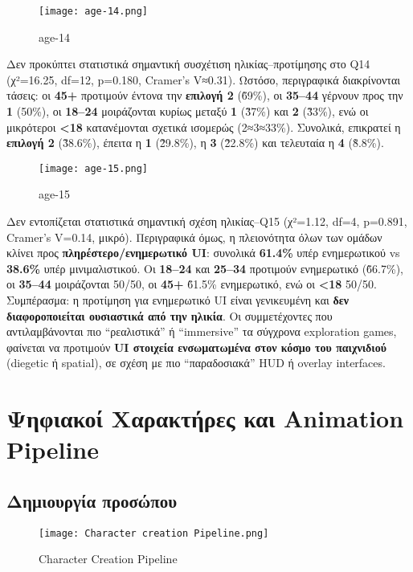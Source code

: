 \begin{figure}[H]
    \centering
    \texttt{[image: age-14.png]}
    \caption{age-14}
    \label{fig:placeholder}
\end{figure}
Δεν προκύπτει στατιστικά σημαντική συσχέτιση ηλικίας–προτίμησης στο Q14 (χ²=16.25, df=12, p=0.180, Cramer’s V≈0.31). Ωστόσο, περιγραφικά διακρίνονται τάσεις: οι \textbf{45+} προτιμούν έντονα την \textbf{επιλογή 2} (\~69\%), οι \textbf{35–44} γέρνουν προς την \textbf{1} (50\%), οι \textbf{18–24} μοιράζονται κυρίως μεταξύ \textbf{1} (\~37\%) και \textbf{2} (\~33\%), ενώ οι μικρότεροι \textbf{<18} κατανέμονται σχετικά ισομερώς (2≈3≈33\%). Συνολικά, επικρατεί η \textbf{επιλογή 2} (\~38.6\%), έπειτα η \textbf{1} (\~29.8\%), η \textbf{3} (\~22.8\%) και τελευταία η \textbf{4} (\~8.8\%). 

\begin{figure}[H]
    \centering
    \texttt{[image: age-15.png]}
    \caption{age-15}
    \label{fig:placeholder}
\end{figure}

Δεν εντοπίζεται στατιστικά σημαντική σχέση ηλικίας–Q15 (χ²=1.12, df=4, p=0.891, Cramer’s V=0.14, μικρό). Περιγραφικά όμως, η πλειονότητα όλων των ομάδων κλίνει προς \textbf{πληρέστερο/ενημερωτικό UI}: συνολικά \textbf{61.4\%} υπέρ ενημερωτικού vs \textbf{38.6\%} υπέρ μινιμαλιστικού. Οι \textbf{18–24} και \textbf{25–34} προτιμούν ενημερωτικό (\~66.7\%), οι \textbf{35–44} μοιράζονται 50/50, οι \textbf{45+} \~61.5\% ενημερωτικό, ενώ οι \textbf{<18} 50/50. Συμπέρασμα: η προτίμηση για ενημερωτικό UI είναι γενικευμένη και \textbf{δεν διαφοροποιείται ουσιαστικά από την ηλικία}. 
Οι συμμετέχοντες που αντιλαμβάνονται πιο “ρεαλιστικά” ή “immersive” τα σύγχρονα exploration games, φαίνεται να προτιμούν \textbf{UI στοιχεία ενσωματωμένα στον κόσμο του παιχνιδιού} (diegetic ή spatial), σε σχέση με πιο “παραδοσιακά” HUD ή overlay interfaces. 

\chapter{Ψηφιακοί Χαρακτήρες και Animation Pipeline}
\section{Δημιουργία προσώπου}

\begin{figure}[H]
    \centering
    \texttt{[image: Character creation Pipeline.png]}
    \caption{Character Creation Pipeline}
    \label{fig:placeholder}
\end{figure}

